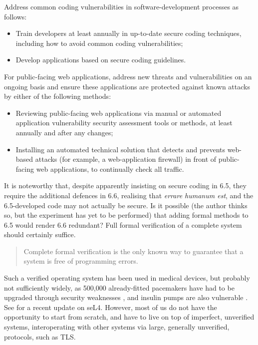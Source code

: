 \documentclass{llncs}
\begin{document}
\begin{description}
\item Address common coding vulnerabilities in software-development processes as follows:
\begin{itemize}
\item Train developers at least annually in up-to-date secure coding techniques, including how to avoid common coding vulnerabilities;
\item Develop applications based on secure coding guidelines.
\end{itemize}
\item For public-facing web applications, address new threats and vulnerabilities on an ongoing basis and ensure these applications are protected against known attacks by either of the following methods:
\begin{itemize}
\item Reviewing public-facing web applications via manual or automated application vulnerability security assessment tools or methods, at least annually and after any changes;
\item Installing an automated technical solution that detects and prevents web-based attacks (for example, a web-application firewall) in front of public-facing web applications, to continually check all traffic.
\end{itemize}
\end{description}

It is noteworthy that, despite apparently insisting on secure coding in 6.5, they require the additional defences in 6.6, realising that \emph{errare humanum est}, and the 6.5-developed code may not actually be secure.  Is it possible (the author thinks so, but the experiment has yet to be performed) that adding formal methods to 6.5 would render 6.6 %
 redundant?
Full formal verification of a complete system should certainly suffice.
\begin{quote}
Complete formal verification is the only known way
to guarantee that a system is free of programming
errors. \cite[describing seL4: a verified operating system]{Kleinetal2009a}
\end{quote}
Such a verified operating system has been used in medical devices, but probably not sufficiently widely, as 500,000 already-fitted pacemakers have had to be upgraded through security weaknesses \cite{Guardian2017g}, and insulin pumps are also vulnerable \cite{Newman2019k}. See \cite{Heiser2019a} for a recent update on seL4.  However, most of us do not have the opportunity to start from scratch, and have to live on top of imperfect, unverified systems, interoperating with other systems via large, generally unverified, protocols, such as TLS. 
\iffalse
\end{document}
